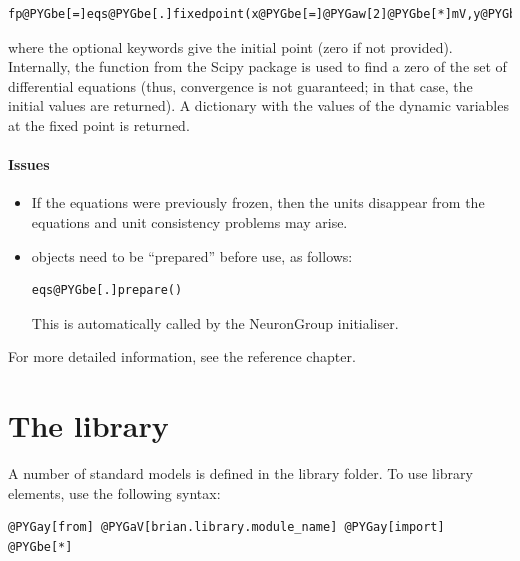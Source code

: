 \documentclass[letterpaper,10pt]{manual}
\begin{document}
\begin{Verbatim}[commandchars=@\[\]]
fp@PYGbe[=]eqs@PYGbe[.]fixedpoint(x@PYGbe[=]@PYGaw[2]@PYGbe[*]mV,y@PYGbe[=]@PYGaw[3]@PYGbe[*]mV)
\end{Verbatim}

where the optional keywords give the initial point (zero if not provided).
Internally, the function  from the Scipy package is used to
find a zero of the set of differential equations (thus, convergence is not
guaranteed; in that case, the initial values are returned).
A dictionary with the values of the dynamic variables at the fixed point is returned.


\subsubsection{Issues}
\begin{itemize}
\item {} 
If the equations were previously frozen, then the units disappear from the equations
and unit consistency problems may arise.

\item {} 
\hyperlink{brian.Equations}{} objects need to be ``prepared'' before use, as follows:

\begin{Verbatim}[commandchars=@\[\]]
eqs@PYGbe[.]prepare()
\end{Verbatim}

This is automatically called by the NeuronGroup initialiser.

\end{itemize}
For more detailed information, see the reference chapter.

\resetcurrentobjects


\chapter{The library}

A number of standard models is defined in the library folder. To use library elements, use the following syntax:

\begin{Verbatim}[commandchars=@\[\]]
@PYGay[from] @PYGaV[brian.library.module_name] @PYGay[import] @PYGbe[*]
\end{Verbatim}
\end{document}
